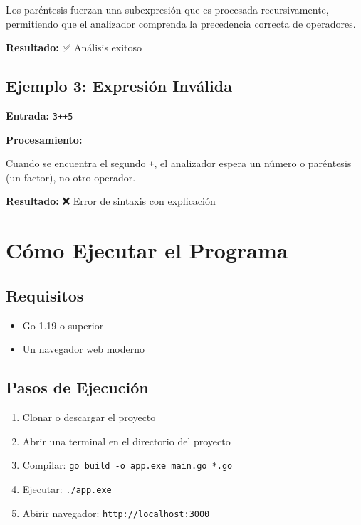 \documentclass[12pt]{article}
\begin{document}
Los paréntesis fuerzan una subexpresión que es procesada recursivamente, permitiendo que el analizador comprenda la precedencia correcta de operadores.

\textbf{Resultado:} ✅ Análisis exitoso

\subsection{Ejemplo 3: Expresión Inválida}

\textbf{Entrada:} \texttt{3++5}

\textbf{Procesamiento:}

Cuando se encuentra el segundo \texttt{+}, el analizador espera un número o paréntesis (un factor), no otro operador.

\textbf{Resultado:} ❌ Error de sintaxis con explicación

\section{Cómo Ejecutar el Programa}

\subsection{Requisitos}

\begin{itemize}
    \item Go 1.19 o superior
    \item Un navegador web moderno
\end{itemize}

\subsection{Pasos de Ejecución}

\begin{enumerate}
    \item Clonar o descargar el proyecto
    \item Abrir una terminal en el directorio del proyecto
    \item Compilar: \texttt{go build -o app.exe main.go *.go}
    \item Ejecutar: \texttt{./app.exe}
    \item Abirir navegador: \texttt{http://localhost:3000}
\end{enumerate}
\end{document}
